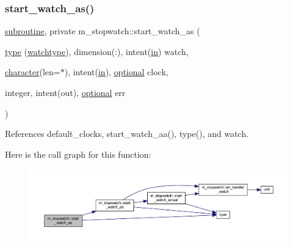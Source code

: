 \subsubsection{\texorpdfstring{start\+\_\+watch\+\_\+as()}{start\_watch\_as()}}
{\footnotesize\ttfamily \hyperlink{M__stopwatch_83_8txt_acfbcff50169d691ff02d4a123ed70482}{subroutine}, private m\+\_\+stopwatch\+::start\+\_\+watch\+\_\+as (\begin{DoxyParamCaption}\item[{\hyperlink{stop__watch_83_8txt_a70f0ead91c32e25323c03265aa302c1c}{type} (\hyperlink{structm__stopwatch_1_1watchtype}{watchtype}), dimension(\+:), intent(\hyperlink{M__journal_83_8txt_afce72651d1eed785a2132bee863b2f38}{in})}]{watch,  }\item[{\hyperlink{option__stopwatch_83_8txt_abd4b21fbbd175834027b5224bfe97e66}{character}(len=$\ast$), intent(\hyperlink{M__journal_83_8txt_afce72651d1eed785a2132bee863b2f38}{in}), \hyperlink{option__stopwatch_83_8txt_aa4ece75e7acf58a4843f70fe18c3ade5}{optional}}]{clock,  }\item[{integer, intent(out), \hyperlink{option__stopwatch_83_8txt_aa4ece75e7acf58a4843f70fe18c3ade5}{optional}}]{err }\end{DoxyParamCaption})\hspace{0.3cm}{\ttfamily [private]}}



References default\+\_\+clocks, start\+\_\+watch\+\_\+aa(), type(), and watch.

Here is the call graph for this function\+:
\nopagebreak
\begin{figure}[H]
\begin{center}
\leavevmode
\includegraphics[width=350pt]{namespacem__stopwatch_a6068b7fef26a5ab12f7b92a765fe32ca_cgraph}
\end{center}
\end{figure}
\mbox{\label{namespacem__stopwatch_a376a3381824a3edde6f1c96663035c58}} 
